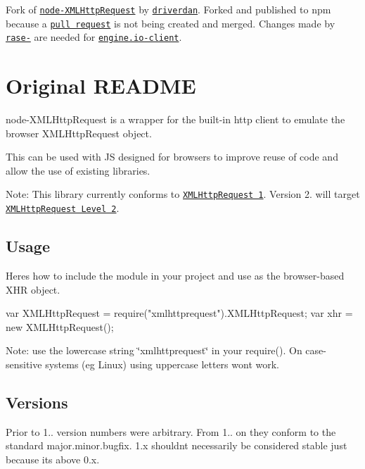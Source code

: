 Fork of \href{https://github.com/driverdan/node-XMLHttpRequest}{\tt node-\/\+X\+M\+L\+Http\+Request} by \href{http://driverdan.com}{\tt driverdan}. Forked and published to npm because a \href{https://github.com/rase-/node-XMLHttpRequest/commit/a6b6f296e0a8278165c2d0270d9840b54d5eeadd}{\tt pull request} is not being created and merged. Changes made by \href{https://github.com/rase-/node-XMLHttpRequest/tree/add/ssl-support}{\tt rase-\/} are needed for \href{https://github.com/Automattic/engine.io-client}{\tt engine.\+io-\/client}.

\section*{Original R\+E\+A\+D\+ME}

node-\/\+X\+M\+L\+Http\+Request is a wrapper for the built-\/in http client to emulate the browser X\+M\+L\+Http\+Request object.

This can be used with JS designed for browsers to improve reuse of code and allow the use of existing libraries.

Note\+: This library currently conforms to \href{http://www.w3.org/TR/XMLHttpRequest/}{\tt X\+M\+L\+Http\+Request 1}. Version 2. will target \href{http://www.w3.org/TR/XMLHttpRequest2/}{\tt X\+M\+L\+Http\+Request Level 2}.

\subsection*{Usage}

Here\textquotesingle{}s how to include the module in your project and use as the browser-\/based X\+HR object. \begin{DoxyVerb}var XMLHttpRequest = require("xmlhttprequest").XMLHttpRequest;
var xhr = new XMLHttpRequest();
\end{DoxyVerb}


Note\+: use the lowercase string \char`\"{}xmlhttprequest\char`\"{} in your require(). On case-\/sensitive systems (eg Linux) using uppercase letters won\textquotesingle{}t work.

\subsection*{Versions}

Prior to 1.. version numbers were arbitrary. From 1.. on they conform to the standard major.\+minor.\+bugfix. 1.\+x shouldn\textquotesingle{}t necessarily be considered stable just because it\textquotesingle{}s above 0.\+x.

